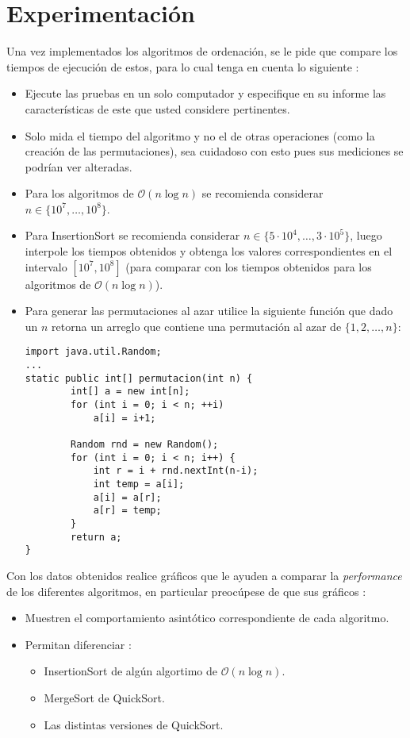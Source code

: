 \documentclass[dcc]{fcfmcourse}
\begin{document}
\section{Experimentación}
Una vez implementados los algoritmos de ordenación, se le pide que compare los tiempos de ejecución de estos, para lo cual tenga en cuenta lo siguiente :
\begin{itemize}
\item Ejecute las pruebas en un solo computador y especifique en su informe las características de este que usted considere pertinentes.
\item Solo mida el tiempo del algoritmo y no el de otras operaciones (como la creación de las permutaciones), sea cuidadoso con esto pues sus mediciones se podrían ver alteradas.
\item Para los algoritmos de $\mathcal{O} (n \log n)$  se recomienda considerar $n \in \lbrace 10^7 , \ldots, 10^8\rbrace$.
\item Para InsertionSort se recomienda considerar $n \in \lbrace 5 \cdot 10^4 , \ldots, 3 \cdot 10^5\rbrace$, luego interpole los tiempos obtenidos y obtenga los valores correspondientes en el intervalo $[10^7, 10^8]$ (para comparar con los tiempos obtenidos para los algoritmos de $\mathcal{O} (n \log n)$).
\item Para generar las permutaciones al azar utilice la siguiente función que dado un $n$ retorna un arreglo que contiene una permutación al azar de $\lbrace 1, 2 , \ldots, n\rbrace$:
\begin{lstlisting}
import java.util.Random;
...
static public int[] permutacion(int n) {
	 	int[] a = new int[n];
	 	for (int i = 0; i < n; ++i)
	 		a[i] = i+1;
	 	
	 	Random rnd = new Random();
	    for (int i = 0; i < n; i++) {
	        int r = i + rnd.nextInt(n-i);
	        int temp = a[i];
	        a[i] = a[r];
	        a[r] = temp;
	    }
	    return a;
}
\end{lstlisting}

\end{itemize}
Con los datos obtenidos realice gráficos que le ayuden a comparar la \textit{performance} de los diferentes algoritmos, en particular preocúpese de que sus gráficos :
\begin{itemize}
\item Muestren el comportamiento asintótico correspondiente de cada algoritmo.
\item Permitan diferenciar :
\begin{itemize}
\item InsertionSort de algún algortimo de $\mathcal{O} (n \log n)$.
\item MergeSort de QuickSort.
\item Las distintas versiones de QuickSort.
\end{itemize}
\end{itemize} 
\newpage
\end{document}
